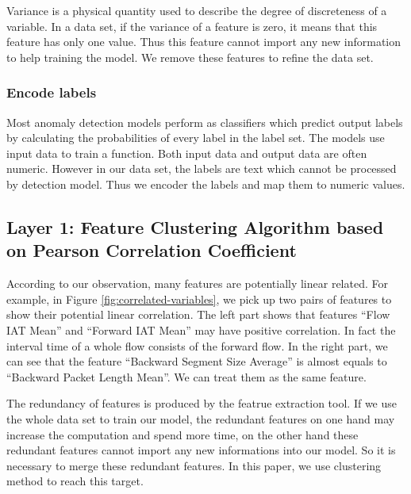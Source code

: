 \documentclass[journal]{IEEEtran}
\begin{document}
Variance is a physical quantity used to describe the degree of discreteness of a variable. In a data set, if the variance of a feature is zero, it means that this feature has only one value. Thus this feature cannot import any new information to help training the model. We remove these features to refine the data set.

\subsubsection{Encode labels}

Most anomaly detection models perform as classifiers which predict output labels by calculating the probabilities of every label in the label set. The models use input data to train a function. Both input data and output data are often numeric. However in our data set, the labels are text which cannot be processed by detection model. Thus we encoder the labels and map them to numeric values.

\subsection{Layer 1: Feature Clustering Algorithm based on Pearson Correlation Coefficient}


According to our observation, many features are potentially linear related. For example, in Figure \ref{fig:correlated-variables}, we pick up two pairs of features to show their potential linear correlation. The left part shows that features ``Flow IAT Mean'' and ``Forward IAT Mean'' may have positive correlation. In fact the interval time of a whole flow consists of the forward flow. In the right part, we can see that the feature ``Backward Segment Size Average'' is almost equals to ``Backward Packet Length Mean''. We can treat them as the same feature. 

The redundancy of features is produced by the featrue extraction tool. If we use the whole data set to train our model, the redundant features on one hand may increase the computation and spend more time, on the other hand these redundant features cannot import any new informations into our model. So it is necessary to merge these redundant features. In this paper, we use clustering method to reach this target. 
\end{document}
